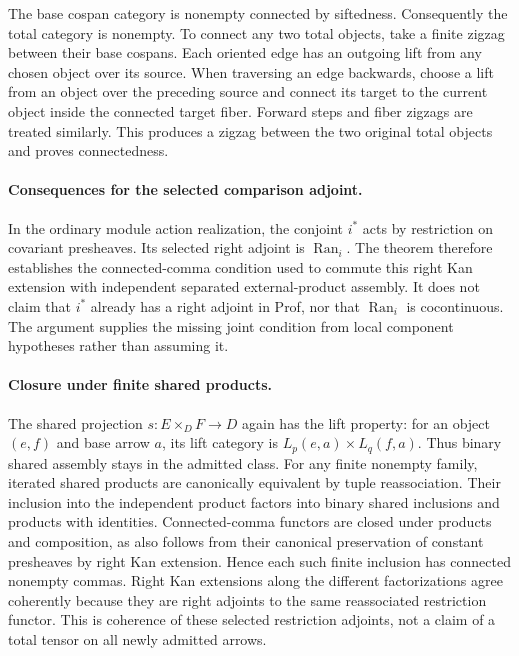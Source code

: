 \documentclass{article}
\begin{document}
The base cospan category is nonempty connected by siftedness. Consequently the total category is nonempty. To connect any two total objects, take a finite zigzag between their base cospans. Each oriented edge has an outgoing lift from any chosen object over its source. When traversing an edge backwards, choose a lift from an object over the preceding source and connect its target to the current object inside the connected target fiber. Forward steps and fiber zigzags are treated similarly. This produces a zigzag between the two original total objects and proves connectedness.

\paragraph{Consequences for the selected comparison adjoint.} In the ordinary module action realization, the conjoint $i^*$ acts by restriction on covariant presheaves. Its selected right adjoint is $\operatorname{Ran}_i$. The theorem therefore establishes the connected-comma condition used to commute this right Kan extension with independent separated external-product assembly. It does not claim that $i^*$ already has a right adjoint in Prof, nor that $\operatorname{Ran}_i$ is cocontinuous. The argument supplies the missing joint condition from local component hypotheses rather than assuming it.

\paragraph{Closure under finite shared products.} The shared projection $s:E\times_D F\to D$ again has the lift property: for an object $(e,f)$ and base arrow $a$, its lift category is $L_p(e,a)\times L_q(f,a)$. Thus binary shared assembly stays in the admitted class. For any finite nonempty family, iterated shared products are canonically equivalent by tuple reassociation. Their inclusion into the independent product factors into binary shared inclusions and products with identities. Connected-comma functors are closed under products and composition, as also follows from their canonical preservation of constant presheaves by right Kan extension. Hence each such finite inclusion has connected nonempty commas. Right Kan extensions along the different factorizations agree coherently because they are right adjoints to the same reassociated restriction functor. This is coherence of these selected restriction adjoints, not a claim of a total tensor on all newly admitted arrows.
\end{document}
